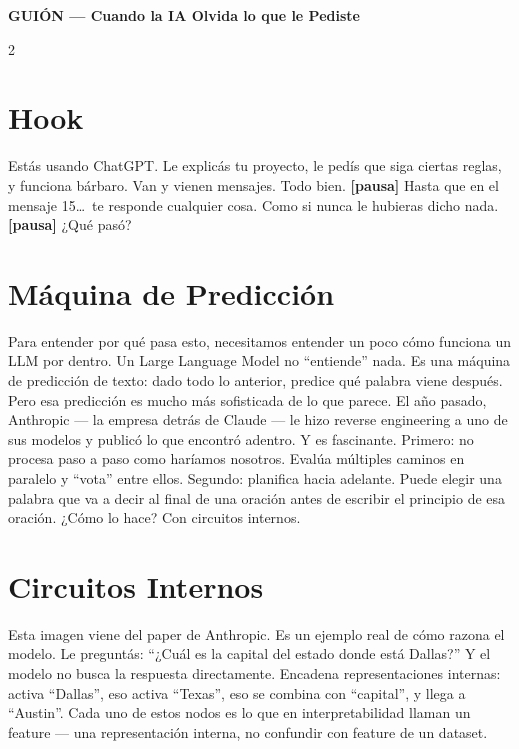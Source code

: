 \documentclass[10pt]{article}
\begin{document}
\begin{center}
{\footnotesize\bfseries GUIÓN — Cuando la IA Olvida lo que le Pediste}
\end{center}

\vspace{-0.5em}

\begin{multicols}{2}
\footnotesize
\leading{10pt}

\section{Hook}
Est\'as usando ChatGPT. Le explic\'as tu proyecto, le ped\'is que siga ciertas reglas, y funciona b\'arbaro. Van y vienen mensajes. Todo bien. \textbf{[pausa]} Hasta que en el mensaje 15\ldots\ te responde cualquier cosa. Como si nunca le hubieras dicho nada. \textbf{[pausa]} ¿Qu\'e pas\'o?

\section{M\'aquina de Predicci\'on}
Para entender por qu\'e pasa esto, necesitamos entender un poco c\'omo funciona un LLM por dentro. Un Large Language Model no ``entiende'' nada. Es una m\'aquina de predicci\'on de texto: dado todo lo anterior, predice qu\'e palabra viene despu\'es. Pero esa predicci\'on es mucho m\'as sofisticada de lo que parece. El a\~no pasado, Anthropic --- la empresa detr\'as de Claude --- le hizo reverse engineering a uno de sus modelos y public\'o lo que encontr\'o adentro. Y es fascinante. Primero: no procesa paso a paso como har\'iamos nosotros. Eval\'ua m\'ultiples caminos en paralelo y ``vota'' entre ellos. Segundo: planifica hacia adelante. Puede elegir una palabra que va a decir al final de una oraci\'on antes de escribir el principio de esa oraci\'on. ¿C\'omo lo hace? Con circuitos internos.

\section{Circuitos Internos}
Esta imagen viene del paper de Anthropic. Es un ejemplo real de c\'omo razona el modelo. Le pregunt\'as: ``¿Cu\'al es la capital del estado donde est\'a Dallas?'' Y el modelo no busca la respuesta directamente. Encadena representaciones internas: activa ``Dallas'', eso activa ``Texas'', eso se combina con ``capital'', y llega a ``Austin''. Cada uno de estos nodos es lo que en interpretabilidad llaman un feature --- una representaci\'on interna, no confundir con feature de un dataset.


\end{multicols}
\end{document}
